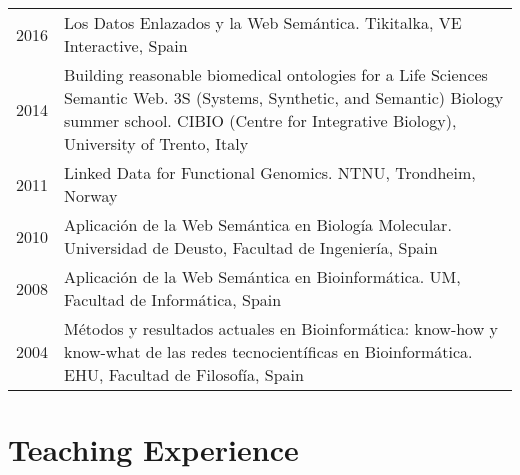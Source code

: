 \documentclass[11pt,fullpage]{article}
\begin{document}
\begin{longtable}{p{0.5in}|p{5.5in}}


2016 & Los Datos Enlazados y la Web Sem\'antica. Tikitalka, VE Interactive, Spain \\

2014 & Building reasonable biomedical ontologies for a Life Sciences Semantic Web. 3S (Systems, Synthetic, and Semantic) Biology summer school. CIBIO (Centre for Integrative Biology), University of Trento, Italy \\

2011 & Linked Data for Functional Genomics. NTNU, Trondheim, Norway \\

2010 & Aplicaci\'on de la Web Sem\'antica en Biolog\'ia Molecular. Universidad de Deusto, Facultad de Ingenier\'ia, Spain \\

2008 & Aplicaci\'on de la Web Sem\'antica en Bioinform\'atica. UM, Facultad de Inform\'atica, Spain \\

2004 & M\'etodos y resultados actuales en Bioinform\'atica: know-how y know-what de las redes tecnocient\'ificas en Bioinform\'atica. EHU, Facultad de Filosof\'ia, Spain

\end{longtable}




\section*{Teaching Experience}
\end{document}
